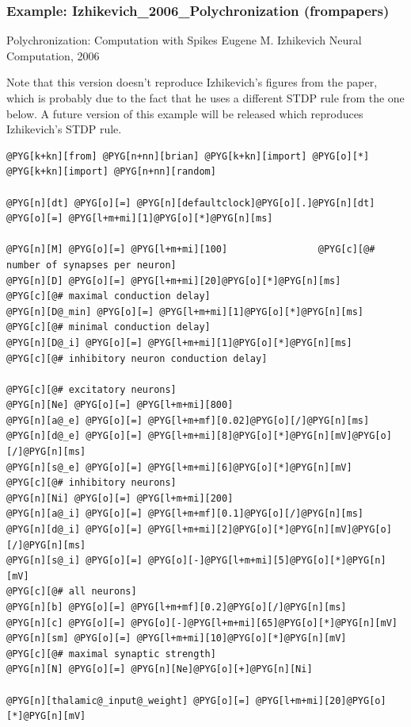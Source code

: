 \documentclass[letterpaper,10pt,english]{manual}
\begin{document}
\hypertarget{index-30}{}\subsubsection{Example: Izhikevich\_2006\_Polychronization (frompapers)}

Polychronization: Computation with Spikes
Eugene M. Izhikevich
Neural Computation, 2006

Note that this version doesn't reproduce Izhikevich's figures from the paper,
which is probably due to the fact that he uses a different STDP rule from the
one below. A future version of this example will be released which reproduces
Izhikevich's STDP rule.

\begin{Verbatim}[commandchars=@\[\]]
@PYG[k+kn][from] @PYG[n+nn][brian] @PYG[k+kn][import] @PYG[o][*]
@PYG[k+kn][import] @PYG[n+nn][random]

@PYG[n][dt] @PYG[o][=] @PYG[n][defaultclock]@PYG[o][.]@PYG[n][dt] @PYG[o][=] @PYG[l+m+mi][1]@PYG[o][*]@PYG[n][ms]

@PYG[n][M] @PYG[o][=] @PYG[l+m+mi][100]                @PYG[c][@# number of synapses per neuron]
@PYG[n][D] @PYG[o][=] @PYG[l+m+mi][20]@PYG[o][*]@PYG[n][ms]              @PYG[c][@# maximal conduction delay]
@PYG[n][D@_min] @PYG[o][=] @PYG[l+m+mi][1]@PYG[o][*]@PYG[n][ms]           @PYG[c][@# minimal conduction delay]
@PYG[n][D@_i] @PYG[o][=] @PYG[l+m+mi][1]@PYG[o][*]@PYG[n][ms]             @PYG[c][@# inhibitory neuron conduction delay]

@PYG[c][@# excitatory neurons]
@PYG[n][Ne] @PYG[o][=] @PYG[l+m+mi][800]
@PYG[n][a@_e] @PYG[o][=] @PYG[l+m+mf][0.02]@PYG[o][/]@PYG[n][ms]
@PYG[n][d@_e] @PYG[o][=] @PYG[l+m+mi][8]@PYG[o][*]@PYG[n][mV]@PYG[o][/]@PYG[n][ms]
@PYG[n][s@_e] @PYG[o][=] @PYG[l+m+mi][6]@PYG[o][*]@PYG[n][mV]
@PYG[c][@# inhibitory neurons]
@PYG[n][Ni] @PYG[o][=] @PYG[l+m+mi][200]
@PYG[n][a@_i] @PYG[o][=] @PYG[l+m+mf][0.1]@PYG[o][/]@PYG[n][ms]
@PYG[n][d@_i] @PYG[o][=] @PYG[l+m+mi][2]@PYG[o][*]@PYG[n][mV]@PYG[o][/]@PYG[n][ms]
@PYG[n][s@_i] @PYG[o][=] @PYG[o][-]@PYG[l+m+mi][5]@PYG[o][*]@PYG[n][mV]
@PYG[c][@# all neurons]
@PYG[n][b] @PYG[o][=] @PYG[l+m+mf][0.2]@PYG[o][/]@PYG[n][ms]
@PYG[n][c] @PYG[o][=] @PYG[o][-]@PYG[l+m+mi][65]@PYG[o][*]@PYG[n][mV]
@PYG[n][sm] @PYG[o][=] @PYG[l+m+mi][10]@PYG[o][*]@PYG[n][mV]             @PYG[c][@# maximal synaptic strength]
@PYG[n][N] @PYG[o][=] @PYG[n][Ne]@PYG[o][+]@PYG[n][Ni]

@PYG[n][thalamic@_input@_weight] @PYG[o][=] @PYG[l+m+mi][20]@PYG[o][*]@PYG[n][mV]


\end{Verbatim}
\end{document}
